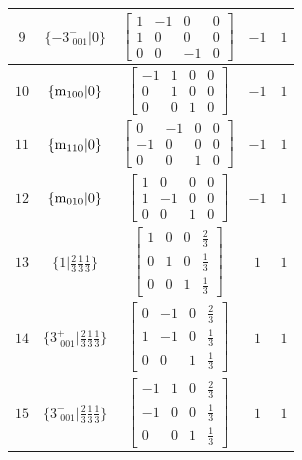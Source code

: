 \documentclass[fleqn,8pt]{jsarticle}
\begin{document}
\begin{longtable}{ccccc}
$ 9 $ & $ \{-3^{-}_{\,\,001}|0\} $ & $ \begin{bmatrix} 1 & -1 & 0 & 0 \\ 1 & 0 & 0 & 0 \\ 0 & 0 & -1 & 0 \end{bmatrix} $ & $ -1 $ & $ 1 $ \\ \hline
$ 10 $ & $ \{{\rm m}_{100}|0\} $ & $ \begin{bmatrix} -1 & 1 & 0 & 0 \\ 0 & 1 & 0 & 0 \\ 0 & 0 & 1 & 0 \end{bmatrix} $ & $ -1 $ & $ 1 $ \\ \hline
$ 11 $ & $ \{{\rm m}_{110}|0\} $ & $ \begin{bmatrix} 0 & -1 & 0 & 0 \\ -1 & 0 & 0 & 0 \\ 0 & 0 & 1 & 0 \end{bmatrix} $ & $ -1 $ & $ 1 $ \\ \hline
$ 12 $ & $ \{{\rm m}_{010}|0\} $ & $ \begin{bmatrix} 1 & 0 & 0 & 0 \\ 1 & -1 & 0 & 0 \\ 0 & 0 & 1 & 0 \end{bmatrix} $ & $ -1 $ & $ 1 $ \\ \hline
$ 13 $ & $ \{1|\frac{2}{3} \frac{1}{3} \frac{1}{3}\} $ & $ \begin{bmatrix} 1 & 0 & 0 & \frac{2}{3} \\ 0 & 1 & 0 & \frac{1}{3} \\ 0 & 0 & 1 & \frac{1}{3} \end{bmatrix} $ & $ 1 $ & $ 1 $ \\ \hline
$ 14 $ & $ \{3^{+}_{\,\,001}|\frac{2}{3} \frac{1}{3} \frac{1}{3}\} $ & $ \begin{bmatrix} 0 & -1 & 0 & \frac{2}{3} \\ 1 & -1 & 0 & \frac{1}{3} \\ 0 & 0 & 1 & \frac{1}{3} \end{bmatrix} $ & $ 1 $ & $ 1 $ \\ \hline
$ 15 $ & $ \{3^{-}_{\,\,001}|\frac{2}{3} \frac{1}{3} \frac{1}{3}\} $ & $ \begin{bmatrix} -1 & 1 & 0 & \frac{2}{3} \\ -1 & 0 & 0 & \frac{1}{3} \\ 0 & 0 & 1 & \frac{1}{3} \end{bmatrix} $ & $ 1 $ & $ 1 $ \\ \hline

\end{longtable}
\end{document}
